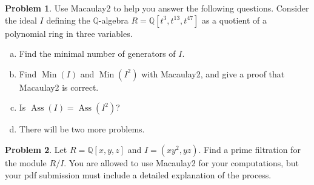 \documentclass[11pt]{article}
\DeclareMathOperator{\Ass}{Ass}
\DeclareMathOperator{\Min}{Min}
\theoremstyle{definition}
\newtheorem{problem}{Problem}
\begin{document}
\begin{problem}
	Use Macaulay2 to help you answer the following questions. Consider the ideal $I$ defining the $\mathbb{Q}$-algebra $R=\mathbb{Q}[t^3,t^{13},t^{47}]$ as a quotient of a polynomial ring in three variables.
	\begin{enumerate}[(a)]
		\item Find the minimal number of generators of $I$.
		\item Find $\Min(I)$ and $\Min(I^2)$ with Macaulay2, and give a proof that Macaulay2 is correct.
		\item Is $\Ass(I) = \Ass(I^2)$?
		\item There will be two more problems.
	\end{enumerate}
\end{problem}


\begin{problem}
	Let $R = \mathbb{Q}[x,y,z]$ and $I = (xy^2,yz)$. Find a prime filtration for the module $R/I$. You are allowed to use Macaulay2 for your computations, but your pdf submission must include a detailed explanation of the process. 
\end{problem}
\end{document}
